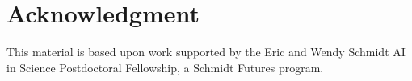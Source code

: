 \section*{Acknowledgment}

This material is based upon work supported by the Eric and Wendy Schmidt AI in Science Postdoctoral Fellowship, a Schmidt Futures program.
